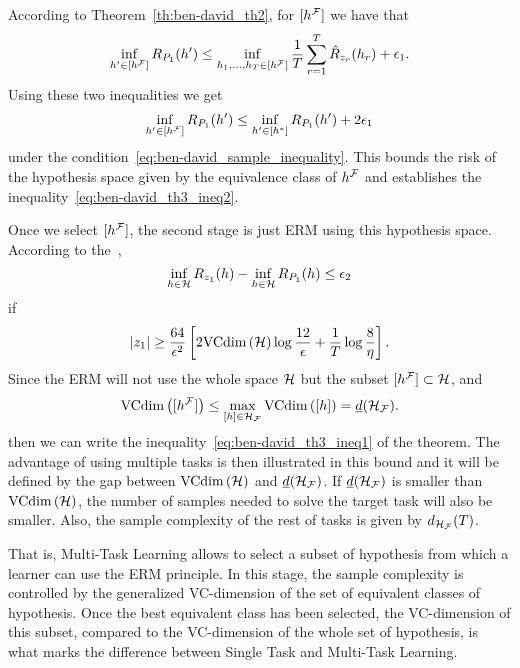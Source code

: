 According to Theorem~\ref{th:ben-david_th2}, for $\lbrack h^{\mathcal{F}}\rbrack$ we have that
\begin{equation}
    \nonumber
    {\inf_{h' \in \lbrack h^{\mathcal{F}}\rbrack}R_{P_1}(h')} \leq \inf_{h_1, \ldots, h_T \in \lbrack h^{\mathcal{F}}\rbrack} \frac{1}{T} \sum_{r=1}^T \hat{R}_{z_r}(h_r)  + \epsilon_1.
\end{equation}
Using these two inequalities we get
\begin{equation}
    \nonumber
    \inf_{h' \in \lbrack h^{\mathcal{F}}\rbrack}R_{P_1}(h') \leq \inf_{h' \in \lbrack h^*\rbrack}R_{P_1}(h') + 2\epsilon_1 
\end{equation}
under the condition~\eqref{eq:ben-david_sample_inequality}. This bounds the risk of the hypothesis space given by the equivalence class of $h^{\mathcal{F}}$ and establishes the inequality~\eqref{eq:ben-david_th3_ineq2}.
%

Once we select $\lbrack h^{\mathcal{F}}\rbrack$, the second stage is just ERM using this hypothesis space.
%
According to the~\cite{vapnik1982estimation},
\begin{equation}\nonumber
    \inf_{h \in \mathcal{H}} R_{z_1}(h) - \inf_{h \in \mathcal{H}} R_{P_1}(h) \leq \epsilon_2
\end{equation}
if
\begin{equation}
    \nonumber
    \left|z_1\right| \geq  \frac{64}{\epsilon^2} \left[2 \text{VCdim}\left(\mathcal{H}\right) \log \frac{12}{\epsilon} + \frac{1}{T}\log\frac{8}{\eta} \right] .
\end{equation}
Since the ERM will not use the whole space $\mathcal{H}$ but the subset $\lbrack h^{\mathcal{F}}\rbrack \subset \mathcal{H}$, and
$$\text{VCdim}\left(\lbrack h^{\mathcal{F}}\rbrack\right) \leq \max_{\lbrack h\rbrack \in \mathcal{H}_{\mathcal{F}}} \text{VCdim}\left(\lbrack h\rbrack\right) = \underline{d}(\mathcal{H}_{\mathcal{F}}).$$
 then we can write the inequality~\eqref{eq:ben-david_th3_ineq1} of the theorem.
%
The advantage of using multiple tasks is then illustrated in this bound and it will be defined by the gap between $\text{VCdim}\left(\mathcal{H}\right)$ and $\underline{d}(\mathcal{H}_{\mathcal{F}})$. If $\underline{d}(\mathcal{H}_{\mathcal{F}})$ is smaller than $\text{VCdim}\left(\mathcal{H}\right)$, the number of samples needed to solve the target task will also be smaller.
Also, the sample complexity of the rest of tasks is given by $d_{\mathcal{H}_{\mathcal{F}}}(T)$.

That is, Multi-Task Learning allows to select a subset of hypothesis from which a learner can use the ERM principle. In this stage, the sample complexity is controlled by the generalized VC-dimension of the set of equivalent classes of hypothesis. Once the best equivalent class has been selected, 
the VC-dimension of this subset, compared to the VC-dimension of the whole set of hypothesis, is what marks the difference between Single Task and Multi-Task Learning.

